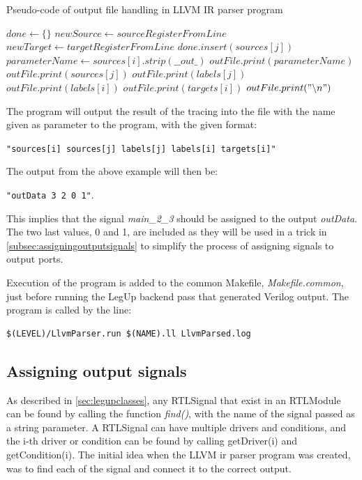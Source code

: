 \begin{algorithm}
  \caption{Pseudo-code of output file handling in LLVM IR parser program
  \label{alg:llvmparserpart2}}
  \begin{algorithmic}[1]
    \State $done \leftarrow \{\}$
            \State $newSource \leftarrow sourceRegisterFromLine$
            \State $newTarget \leftarrow targetRegisterFromLine$
            \State $done.insert(sources[j])$
              \State $parameterName \leftarrow sources[i].strip(\_\_out\_)$
              \State $outFile.print(parameterName)$
              \State $outFile.print(sources[j])$
              \State $outFile.print(labels[j])$
              \State $outFile.print(labels[i])$
              \State $outFile.print(targets[i])$
              \State $outFile.print("\backslash n")$ 
            \EndIf
          \EndIf
        \EndFor
      \EndFor
    \EndIf
  \end{algorithmic}
\end{algorithm}

The program will output the result of the tracing into the file with the name given as parameter to the program, with the given format:

\verb!"sources[i] sources[j] labels[j] labels[i] targets[i]"!

The output from the above example will then be:

\verb!"outData 3 2 0 1"!.

This implies that the signal \textit{main\_2\_3} should be assigned to the output \textit{outData}. The two last values, 0 and 1, are included as they will be used in a trick in \cref{subsec:assigningoutputsignals} to simplify the process of assigning signals to output ports.

Execution of the program is added to the common Makefile, \textit{Makefile.common}, just before running the LegUp backend pass that generated Verilog output. The program is called by the line:
\begin{verbatim}
$(LEVEL)/LlvmParser.run $(NAME).ll LlvmParsed.log
\end{verbatim}

\subsection{\label{subsec:assigningoutputsignals}Assigning output signals}
As described in \cref{sec:legupclasses}, any RTLSignal that exist in an RTLModule can be found by calling the function \textit{find()}, with the name of the signal passed as a string parameter. A RTLSignal can have multiple drivers and conditions, and the i-th driver or condition can be found by calling getDriver(i) and getCondition(i). The initial idea when the LLVM \gls{ir} parser program was created, was to find each of the signal and connect it to the correct output.

